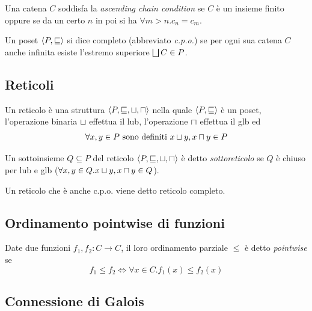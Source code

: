 \begin{definition}
Una catena $C$ soddisfa la \emph{ascending chain condition} se $C$ è un insieme finito oppure se da un certo $n$ in poi si ha $\forall m > n . c_n = c_m$.
\end{definition}

\begin{definition}
Un poset $\langle P, \sqsubseteq \rangle$ si dice completo (abbreviato \emph{c.p.o.}) se per ogni sua catena $C$ anche infinita esiste l'estremo superiore $\join[C] \in P$.
\end{definition}

\subsection{Reticoli}\label{sec:reticoli}

\begin{definition}[Reticolo]
Un reticolo è una struttura $\struct{P, \sqsubseteq, \join, \meet}$ nella quale $\langle P, \sqsubseteq \rangle$ è un poset, l'operazione binaria $\join$ effettua il lub, l'operazione $\meet$ effettua il glb ed 
\[ \forall x,y \in P \text{ sono definiti } \join[x][y], \meet[x][y] \in P \]
\end{definition}

\begin{definition}[Sottoreticolo]
Un sottoinsieme $Q \subseteq P$ del reticolo $\struct{P, \sqsubseteq, \join, \meet}$ è detto \emph{sottoreticolo} se $Q$ è chiuso per lub e glb ($\forall x,y \in Q . \join[x][y], \meet[x][y] \in Q$). 
\end{definition}

\begin{definition}
Un reticolo che è anche c.p.o. viene detto reticolo completo.
\end{definition}

\subsection{Ordinamento pointwise di funzioni}

Date due funzioni $f_1, f_2 : C \to C$, il loro ordinamento parziale $\le$ è detto \emph{pointwise} se
\[ f_1 \le f_2 \iff \forall x \in C . f_1(x) \le f_2(x) \]

\subsection{Connessione di Galois}\label{sec:galois}

